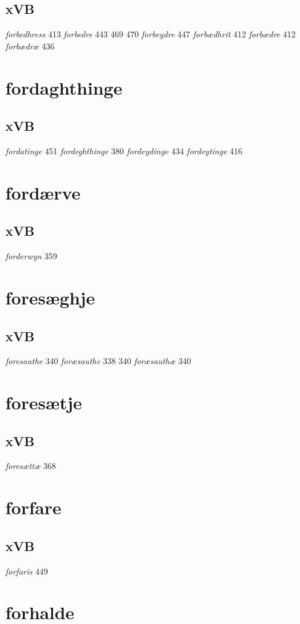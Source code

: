 \documentclass[a4paper,twocolumn]{article}
\begin{document}
\subsection{xVB}
\label{sec:org7852117}
\emph{forbedhress} 413 \emph{forbedre} 443 469 470 \emph{forbeydre} 447 \emph{forbædhrit} 412 \emph{forbædre} 412 \emph{forbædræ} 436 
\section{fordaghthinge}
\label{sec:org9aebf6d}
\subsection{xVB}
\label{sec:org1b95c71}
\emph{fordatinge} 451 \emph{fordeghthinge} 380 \emph{fordeydinge} 434 \emph{fordeytinge} 416 
\section{fordærve}
\label{sec:orga1bdda7}
\subsection{xVB}
\label{sec:org843e221}
\emph{forderwyn} 359 
\section{foresæghje}
\label{sec:org8674e4b}
\subsection{xVB}
\label{sec:org8025e46}
\emph{foresauthe} 340 \emph{foræsauthe} 338 340 \emph{foræsauthæ} 340 
\section{foresætje}
\label{sec:org8337f70}
\subsection{xVB}
\label{sec:orgc711947}
\emph{foresættæ} 368 
\section{forfare}
\label{sec:org416890d}
\subsection{xVB}
\label{sec:org5ebd48b}
\emph{forfaris} 449 
\section{forhalde}
\label{sec:org4866360}
\end{document}
